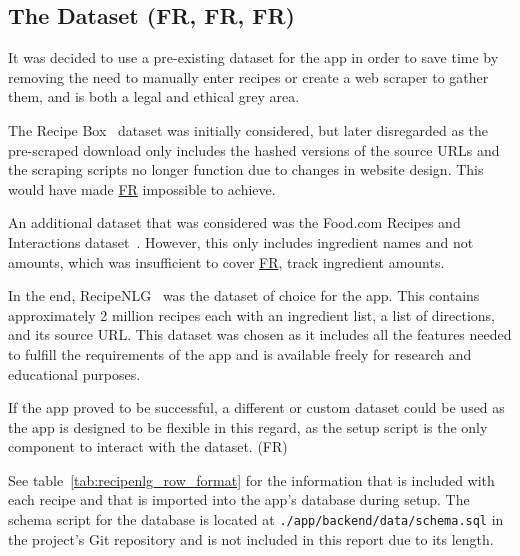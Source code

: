 
\subsection{The Dataset (FR, FR, FR)}\label{sec:data_pre_process}

It was decided to use a pre-existing dataset for the app in order to save time by removing the need to manually enter recipes
or create a web scraper to gather them, and is both a legal and ethical grey area.~\cite{murray_state_university_legality_2020}

The Recipe Box~\cite{lee_recipe_2017} dataset was initially considered, but later disregarded as the pre-scraped download only includes the
hashed versions of the source URLs and the scraping scripts no longer function due to changes in website design. This would have made
\hyperref[req:sources]{FR} impossible to achieve.

An additional dataset that was considered was the Food.com Recipes and Interactions dataset~\cite{li_foodcom_2019}. However, this only includes
ingredient names and not amounts, which was insufficient to cover \hyperref[req:track_amounts]{FR}, track ingredient amounts.

In the end, RecipeNLG~\cite{bien_recipenlg_2020} was the dataset of choice for the \chef{} app. This contains approximately 2 million recipes
each with an ingredient list, a list of directions, and its source URL. This dataset was chosen as it includes all the features needed to
fulfill the requirements of the app and is available freely for research and educational purposes.

If the app proved to be successful, a different or custom dataset could be used as the app is designed
to be flexible in this regard, as the setup script is the only component to interact with the dataset. (FR)

See table~\ref{tab:recipenlg_row_format} for the information that is included with each recipe and that is imported into
the app's database during setup. The schema script for the database is located at \texttt{./app/backend/data/schema.sql}
in the project's Git repository and is not included in this report due to its length.

